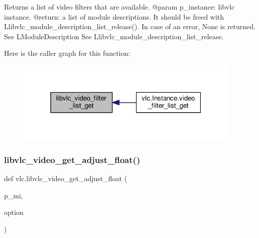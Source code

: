 \begin{DoxyVerb}Returns a list of video filters that are available.
@param p_instance: libvlc instance.
@return: a list of module descriptions. It should be freed with L{libvlc_module_description_list_release}(). In case of an error, None is returned. See L{ModuleDescription} See L{libvlc_module_description_list_release}.
\end{DoxyVerb}
 Here is the caller graph for this function\+:
\nopagebreak
\begin{figure}[H]
\begin{center}
\leavevmode
\includegraphics[width=304pt]{namespacevlc_a9a36ab0bc4560c42db45708f4c31e1f2_icgraph}
\end{center}
\end{figure}
\mbox{\label{namespacevlc_af6b4ba880f091b003978517c9ef566cb}} 
\subsubsection{\texorpdfstring{libvlc\+\_\+video\+\_\+get\+\_\+adjust\+\_\+float()}{libvlc\_video\_get\_adjust\_float()}}
{\footnotesize\ttfamily def vlc.\+libvlc\+\_\+video\+\_\+get\+\_\+adjust\+\_\+float (\begin{DoxyParamCaption}\item[{}]{p\+\_\+mi,  }\item[{}]{option }\end{DoxyParamCaption})}

